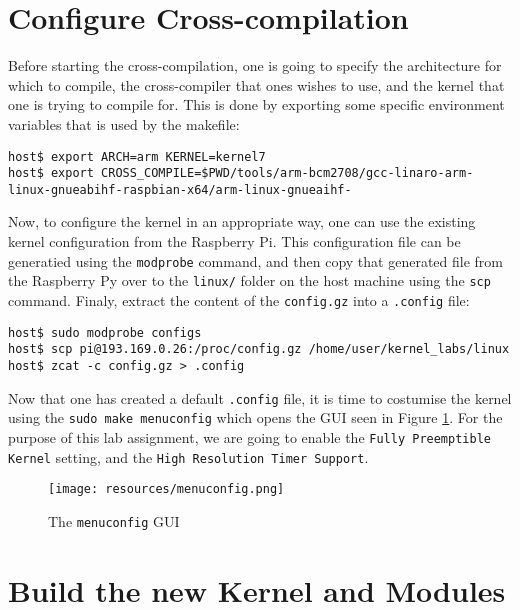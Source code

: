 \documentclass[a4paper,oneside,onecolumn]{article}
\newcommand{\code}[1]{\colorbox{codegray}{\texttt{#1}}}
\begin{document}
\section{Configure Cross-compilation}

Before starting the cross-compilation, one is going to specify the architecture for which to compile, the cross-compiler that ones wishes to use, and the kernel that one is trying to compile for. This is done by exporting some specific environment variables that is used by the makefile:
\begin{lstlisting}
host$ export ARCH=arm KERNEL=kernel7
host$ export CROSS_COMPILE=$PWD/tools/arm-bcm2708/gcc-linaro-arm-linux-gnueabihf-raspbian-x64/arm-linux-gnueaihf-
\end{lstlisting}
Now, to configure the kernel in an appropriate way, one can use the existing kernel configuration from the Raspberry Pi. This configuration file can be generatied using the \code{modprobe} command, and then copy that generated file from the Raspberry Py over to the \texttt{linux/} folder on the host machine using the \code{scp} command. Finaly, extract the content of the \texttt{config.gz} into a \texttt{.config} file:
\begin{lstlisting}
host$ sudo modprobe configs
host$ scp pi@193.169.0.26:/proc/config.gz /home/user/kernel_labs/linux
host$ zcat -c config.gz > .config
\end{lstlisting}
Now that one has created a default \texttt{.config} file, it is time to costumise the kernel using the \code{sudo make menuconfig} which opens the GUI seen in Figure \ref{fig:menuconfig}. For the purpose of this lab assignment, we are going to enable the \texttt{Fully Preemptible Kernel} setting, and the \texttt{High Resolution Timer Support}.
\begin{figure}[htbp]
	\centering
	\texttt{[image: resources/menuconfig.png]}
	\caption{The \texttt{menuconfig} GUI}
	\label{fig:menuconfig}
\end{figure}

\section{Build the new Kernel and Modules}
\end{document}
